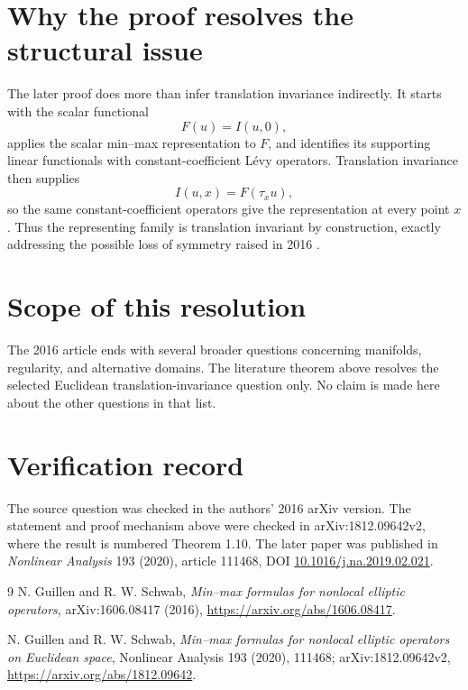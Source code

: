 \documentclass[11pt]{article}
\begin{document}
\section*{Why the proof resolves the structural issue}
The later proof does more than infer translation invariance indirectly.  It starts with the scalar functional
\[
 F(u)=I(u,0),
\]
applies the scalar min--max representation to \(F\), and identifies its supporting linear functionals with constant-coefficient L\'evy operators.  Translation invariance then supplies
\[
 I(u,x)=F(\tau_xu),
\]
so the same constant-coefficient operators give the representation at every point \(x\).  Thus the representing family is translation invariant by construction, exactly addressing the possible loss of symmetry raised in 2016 \cite[proof of Theorem 1.10]{GS2020}.

\section*{Scope of this resolution}
The 2016 article ends with several broader questions concerning manifolds, regularity, and alternative domains.  The literature theorem above resolves the selected Euclidean translation-invariance question only.  No claim is made here about the other questions in that list.

\section*{Verification record}
The source question was checked in the authors' 2016 arXiv version.  The statement and proof mechanism above were checked in arXiv:1812.09642v2, where the result is numbered Theorem 1.10.  The later paper was published in \emph{Nonlinear Analysis} 193 (2020), article 111468, DOI \href{https://doi.org/10.1016/j.na.2019.02.021}{10.1016/j.na.2019.02.021}.

\begin{thebibliography}{9}
N. Guillen and R. W. Schwab,
\emph{Min--max formulas for nonlocal elliptic operators},
arXiv:1606.08417 (2016),
\url{https://arxiv.org/abs/1606.08417}.

N. Guillen and R. W. Schwab,
\emph{Min--max formulas for nonlocal elliptic operators on Euclidean space},
Nonlinear Analysis 193 (2020), 111468;
arXiv:1812.09642v2,
\url{https://arxiv.org/abs/1812.09642}.
\end{thebibliography}
\end{document}
